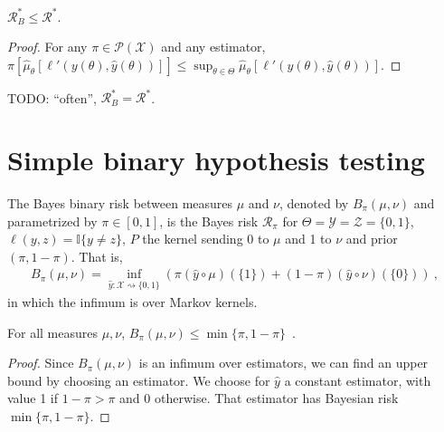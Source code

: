 \begin{lemma}
  \label{lem:bayesRisk_le_minimaxRisk}
  \leanok
  $\mathcal R_B^* \le \mathcal R^*$.
\end{lemma}

\begin{proof}\leanok
For any $\pi \in \mathcal P(\mathcal X)$ and any estimator, $\pi\left[\hat{\mu}_\theta\left[\ell'(y(\theta), \hat{y}(\theta))\right]\right] \le \sup_{\theta \in \Theta}\hat{\mu}_\theta\left[\ell'(y(\theta), \hat{y}(\theta))\right]$.
\end{proof}

TODO: ``often'', $\mathcal R^*_B = \mathcal R^*$.

\section{Simple binary hypothesis testing}

\begin{definition}
  \label{def:bayesBinaryRisk}
  \leanok
  The Bayes binary risk between measures $\mu$ and $\nu$, denoted by $B_\pi(\mu, \nu)$ and parametrized by $\pi \in [0,1]$, is the Bayes risk $\mathcal R_\pi$ for $\Theta = \mathcal Y = \mathcal Z = \{0,1\}$, $\ell(y,z) = \mathbb{I}\{y \ne z\}$, $P$ the kernel sending 0 to $\mu$ and 1 to $\nu$ and prior $(\pi, 1-\pi)$.
  That is,
  \begin{align*}
  B_\pi(\mu, \nu) = \inf_{\hat{y} : \mathcal X \rightsquigarrow \{0,1\}}\left(\pi (\hat{y} \circ \mu)(\{1\}) + (1 - \pi) (\hat{y} \circ \nu)(\{0\})\right)
  \: ,
  \end{align*}
  in which the infimum is over Markov kernels.
\end{definition}

\begin{lemma}
  \label{lem:bayesBinaryRisk_le}
  \leanok
  For all measures $\mu, \nu$, $B_\pi(\mu, \nu) \le \min\{\pi, 1 - \pi\}$~.
\end{lemma}

\begin{proof}%
{}
Since $B_\pi(\mu, \nu)$ is an infimum over estimators, we can find an upper bound by choosing an estimator. We choose for $\hat{y}$ a constant estimator, with value 1 if $1- \pi > \pi$ and 0 otherwise.
That estimator has Bayesian risk $\min\{\pi, 1 - \pi\}$.
\end{proof}


